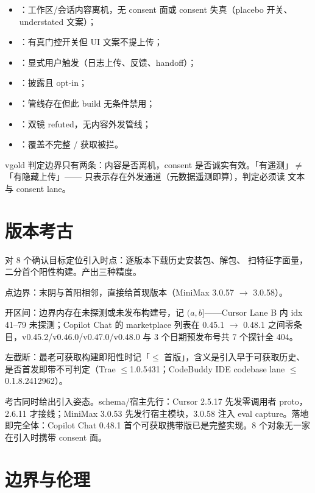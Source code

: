 \begin{itemize}
\item {}：工作区/会话内容离机，无 consent 面或 consent 失真（placebo 开关、understated 文案）；
\item {}：有真门控开关但 UI 文案不提上传；
\item {}：显式用户触发（日志上传、反馈、handoff）；
\item {}：披露且 opt-in；
\item {}：管线存在但此 build 无条件禁用；
\item {}：双镜 refuted，无内容外发管线；
\item {}：覆盖不完整 / 获取被拦。
\end{itemize}

\begin{verdictbox}{vgold}
判定边界只有两条：内容是否离机，consent 是否诚实有效。「有遥测」$\neq$「有隐藏上传」—— 只表示存在外发通道（元数据遥测即算），判定必须读  文本与 consent lane。
\end{verdictbox}

\section{版本考古}

对 8 个确认目标定位引入时点：逐版本下载历史安装包、解包、 扫特征字面量，二分首个阳性构建。产出三种精度。

点边界：末阴与首阳相邻，直接给首现版本（MiniMax 3.0.57 $\to$ 3.0.58）。

开区间：边界内存在未探测或未发布构建号，记 $(a,b]$——Cursor Lane B \ep{(0.44.9,1.0.1]} 内 idx 41--79 未探测；Copilot Chat 的 marketplace 列表在 0.45.1 $\to$ 0.48.1 之间零条目，v0.45.2/v0.46.0/v0.47.0/v0.48.0 与 3 个日期预发布号共 7 个探针全 404。

左截断：最老可获取构建即阳性时记「$\le$ 首版」，含义是引入早于可获取历史、是否首发即带不可判定（Trae $\le$1.0.5431；CodeBuddy IDE codebase lane $\le$0.1.8.2412962）。

考古同时给出引入姿态。schema/宿主先行：Cursor 2.5.17 先发零调用者 proto，2.6.11 才接线；MiniMax 3.0.53 先发行宿主模块，3.0.58 注入 eval capture。落地即完全体：Copilot Chat 0.48.1 首个可获取携带版已是完整实现。8 个对象无一家在引入时携带 consent 面。

\section{边界与伦理}


